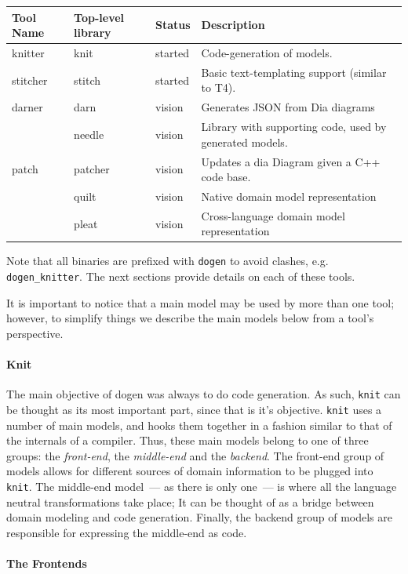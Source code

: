 \documentclass{book}
\begin{document}
\begin{center}
\begin{tabular}{llll}
Tool Name & Top-level library & Status & Description\\
\hline
knitter & knit & started & Code-generation of models.\\
stitcher & stitch & started & Basic text-templating support (similar to T4).\\
darner & darn & vision & Generates JSON from Dia diagrams\\
 & needle & vision & Library with supporting code, used by generated models.\\
patch & patcher & vision & Updates a dia Diagram given a C++ code base.\\
 & quilt & vision & Native domain model representation\\
 & pleat & vision & Cross-language domain model representation\\
\end{tabular}
\end{center}

Note that all binaries are prefixed with \texttt{dogen} to avoid
clashes, e.g. \texttt{dogen\_knitter}. The next sections provide
details on each of these tools.

It is important to notice that a main model may be used by more than
one tool; however, to simplify things we describe the main models
below from a tool's perspective.

\paragraph{Knit}

The main objective of dogen was always to do code generation. As such,
\texttt{knit} can be thought as its most important part, since that is
it's objective. \texttt{knit} uses a number of main models, and hooks
them together in a fashion similar to that of the internals of a
compiler. Thus, these main models belong to one of three groups: the
\emph{front-end}, the \emph{middle-end} and the \emph{backend}. The
front-end group of models allows for different sources of domain
information to be plugged into \texttt{knit}. The middle-end model~---
as there is only one~--- is where all the language neutral
transformations take place; It can be thought of as a bridge between
domain modeling and code generation. Finally, the backend group of
models are responsible for expressing the middle-end as code.

\paragraph{The Frontends}
\end{document}
